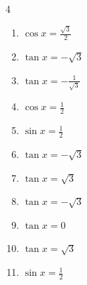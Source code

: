 \begin{multicols}{4}
\begin{enumerate}
  \item $\displaystyle \cos{x}  = \frac{\sqrt{3}}{2}$


  \item $\displaystyle \tan{x}  = -\sqrt{3}$


  \item $\displaystyle \tan{x}  = -\frac{1}{\sqrt{3}}$


  \item $\displaystyle \cos{x}  = \frac{1}{2}$


  \item $\displaystyle \sin{x}  = \frac{1}{2}$


\columnbreak %

\resetques

  \item $\displaystyle \tan{x}  = -\sqrt{3}$


  \item $\displaystyle \tan{x}  = \sqrt{3}$


  \item $\displaystyle \tan{x}  = -\sqrt{3}$


  \item $\displaystyle \tan{x}  = 0$

        \phantom{$\displaystyle x = 0 , \pi$}

  \item $\displaystyle \tan{x}  = \sqrt{3}$


  \item $\displaystyle \sin{x}  = \frac{1}{2}$



\end{enumerate}
\end{multicols}
